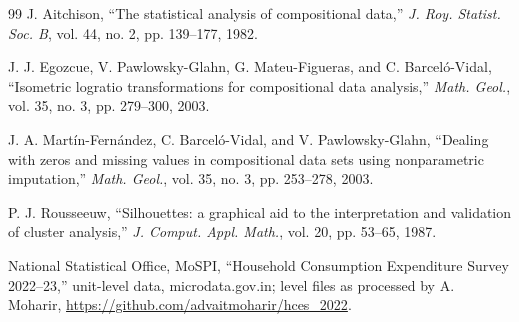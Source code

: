 \documentclass[conference]{IEEEtran}
\begin{document}
\begin{thebibliography}{99}
J. Aitchison, ``The statistical analysis of compositional data,'' \emph{J. Roy. Statist. Soc. B}, vol. 44, no. 2, pp. 139--177, 1982.

J. J. Egozcue, V. Pawlowsky-Glahn, G. Mateu-Figueras, and C. Barcel\'o-Vidal, ``Isometric logratio transformations for compositional data analysis,'' \emph{Math. Geol.}, vol. 35, no. 3, pp. 279--300, 2003.

J. A. Mart\'in-Fern\'andez, C. Barcel\'o-Vidal, and V. Pawlowsky-Glahn, ``Dealing with zeros and missing values in compositional data sets using nonparametric imputation,'' \emph{Math. Geol.}, vol. 35, no. 3, pp. 253--278, 2003.

P. J. Rousseeuw, ``Silhouettes: a graphical aid to the interpretation and validation of cluster analysis,'' \emph{J. Comput. Appl. Math.}, vol. 20, pp. 53--65, 1987.

National Statistical Office, MoSPI, ``Household Consumption Expenditure Survey 2022--23,'' unit-level data, microdata.gov.in; level files as processed by A. Moharir, \url{https://github.com/advaitmoharir/hces_2022}.

\end{thebibliography}
\end{document}
